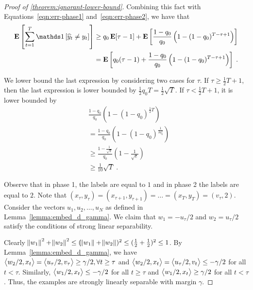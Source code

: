 \begin{proof}[Proof of \autoref{theorem:ignorant-lower-bound}]




Combining this fact with Equations~\eqref{eqn:err-phase1} and~\eqref{eqn:err-phase2}, we have that
\begin{align*}
 \Exp \left[\sum_{t=1}^T \indicator{\widehat y_t\neq y_t}\right]
& \ge q_0 \Exp[\tau - 1] + \Exp \left[\frac{1-q_0}{q_0}\left(1-(1-q_0)^{T-\tau+1}\right)\right] \\
& =  \Exp \left[  q_0 (\tau - 1) + \frac{1-q_0}{q_0}\left(1-(1-q_0)^{T-\tau+1}\right)  \right] \; .
\end{align*}


We lower bound the last expression by considering two cases for $\tau$.
If $\tau \ge \frac{1}{2}T + 1$, then the last expression is lower bounded by
$\frac{1}{2}q_0 T = \frac{1}{2} \sqrt{T}$. If
$\tau < \frac{1}{2}T+1$, it is lower bounded by
\begin{align*}
& \frac{1-q_0}{q_0}\left(1-(1-q_0)^{\frac{1}{2}T}\right) \\
& = \frac{1-q_0}{q_0}\left(1-(1-q_0)^{\frac{1}{2q_0^2}}\right) \\
& \ge \frac{1-\frac{1}{\sqrt{2}}}{q_0}\left(1-\frac{1}{\sqrt{e}}\right) \\
& \ge \frac{1}{10} \sqrt{T} \; .
\end{align*}

Observe that in phase 1, the labels are equal to $1$ and in phase 2 the labels
are equal to $2$. Note that $(x_\tau, y_\tau)=(x_{\tau+1}, y_{\tau+1})= \dots =
(x_T, y_T) = (v_\tau, 2)$. Consider the vectors $u_1, u_2, \dots, u_N$ as
defined in Lemma~\ref{lemma:embed_d_gamma}. We claim that $w_1=-u_\tau/2$ and
$w_2=u_\tau/2$ satisfy the conditions of strong linear separability.

Clearly $\norm{w_1}^2 + \norm{w_2}^2 \le (\norm{w_1} + \norm{w_2})^2 \le
(\frac{1}{2} + \frac{1}{2})^2 \le 1$. By Lemma~\ref{lemma:embed_d_gamma}, we
have $\left\langle w_2/2, x_t \right\rangle = \left\langle u_\tau/2, v_\tau \right\rangle \ge \gamma/2, \forall t \ge \tau$ and
$\left\langle w_2/2, x_t \right\rangle = \left\langle u_\tau/2, v_t \right\rangle \le - \gamma/2$ for all $t < \tau$. Similarly,
$\left\langle w_1/2, x_t \right\rangle \le -\gamma/2$ for all $t \ge \tau$ and $\left\langle w_1/2, x_t \right\rangle \ge
\gamma/2$ for all $t < \tau$. Thus, the examples are strongly linearly
separable with margin $\gamma$.
\end{proof}

